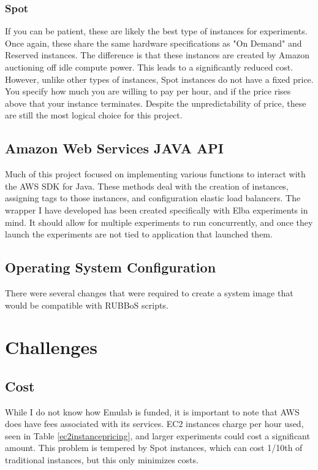 \documentclass{article}
\begin{document}
\subsubsection{Spot}
If you can be patient, these are likely the best type of instances for experiments. Once again, these share the same hardware specifications as "On Demand" and Reserved instances. The difference is that these instances are created by Amazon auctioning off idle compute power. This leads to a significantly reduced cost.
However, unlike other types of instances, Spot instances do not have a fixed price. You specify how much you are willing to pay per hour, and if the price rises above that your instance terminates. Despite the unpredictability of price, these are still the most logical choice for this project.
\subsection{Amazon Web Services JAVA API}
Much of this project focused on implementing various functions to interact with  the AWS SDK for Java. These methods deal with the creation of instances, assigning tags to those instances, and configuration elastic load balancers. The wrapper I have developed has been created specifically with Elba experiments in mind. It should allow for multiple experiments to run concurrently, and once they launch the experiments are not tied to application that launched them.
\subsection{Operating System Configuration}
There were several changes that were required to create a system image that would be compatible with RUBBoS scripts.
\section{Challenges}
\subsection{Cost}
While I do not know how Emulab is funded, it is important to note that AWS does have fees associated with its services. EC2 instances charge per hour used, seen in Table \ref{ec2instancepricing}, and larger experiments could cost a significant amount. This problem is tempered by Spot instances, which can cost 1/10th of traditional instances, but this only minimizes costs.
\end{document}
